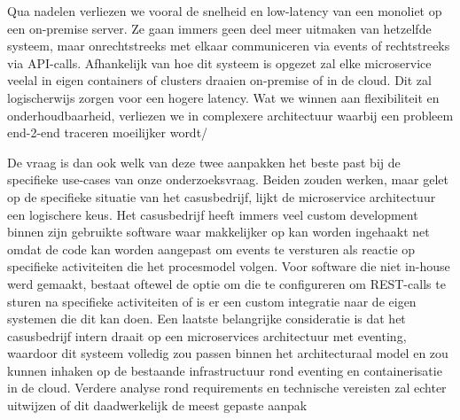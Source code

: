Qua nadelen verliezen we vooral de snelheid en low-latency van een monoliet op een on-premise server. Ze gaan immers geen deel meer uitmaken van hetzelfde systeem, maar onrechtstreeks met elkaar communiceren via events of rechtstreeks via API-calls. Afhankelijk van hoe dit systeem is opgezet zal elke microservice veelal in eigen containers of clusters draaien on-premise of in de cloud. Dit zal logischerwijs zorgen voor een hogere latency. Wat we winnen aan flexibiliteit en onderhoudbaarheid, verliezen we in complexere architectuur waarbij een probleem end-2-end traceren moeilijker wordt/\newline

De vraag is dan ook welk van deze twee aanpakken het beste past bij de specifieke use-cases van onze onderzoeksvraag. Beiden zouden werken, maar gelet op de specifieke situatie van het casusbedrijf, lijkt de microservice architectuur een logischere keus. Het casusbedrijf heeft immers veel custom development binnen zijn gebruikte software waar makkelijker op kan worden ingehaakt net omdat de code kan worden aangepast om events te versturen als reactie op specifieke activiteiten die het procesmodel volgen. Voor software die niet in-house werd gemaakt, bestaat oftewel de optie om die te configureren om REST-calls te sturen na specifieke activiteiten of is er een custom integratie naar de eigen systemen die dit kan doen. Een laatste belangrijke consideratie is dat het casusbedrijf intern draait op een microservices architectuur met eventing, waardoor dit systeem volledig zou passen binnen het architecturaal model en zou kunnen inhaken op de bestaande infrastructuur rond eventing en containerisatie in de cloud. Verdere analyse rond requirements en technische vereisten zal echter uitwijzen of dit daadwerkelijk de meest gepaste aanpak \newline
